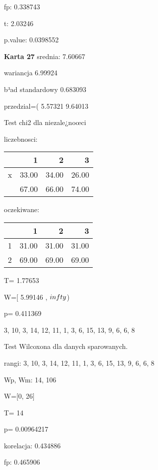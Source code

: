 \documentclass[a4paper,12pt]{article}
\begin{document}
\begin{multicols}{3}
     fp: 0.338743
     
     t: 2.03246
     
     p.value: 0.0398552 \vspace{1cm} 

  \textbf{Karta  27 } 
 srednia: 7.60667 
     
     wariancja 6.99924  
     
     b³ad standardowy 0.683093 
     
     przedzial=( 5.57321 9.64013 \vspace{1cm} 

  Test chi2 dla niezale¿noœci 
   
   liczebnosci: %
\begin{tabular}{rrrr}
  \hline
 & 1 & 2 & 3 \\
  \hline
x & 33.00 & 34.00 & 26.00 \\
   & 67.00 & 66.00 & 74.00 \\
   \hline
\end{tabular}
 
   
   oczekiwane: %
\begin{tabular}{rrrr}
  \hline
 & 1 & 2 & 3 \\
  \hline
1 & 31.00 & 31.00 & 31.00 \\
  2 & 69.00 & 69.00 & 69.00 \\
   \hline
\end{tabular}
 
   
   T= 1.77653 
   
   W=[ 5.99146 , $\\infty$) 
   
   p= 0.411369 \vspace{1cm} 

  3, 10, 3, 14, 12, 11, 1, 3, 6, 15, 13, 9, 6, 6, 8 

  Test Wilcoxona dla danych sparowanych. 
  
  rangi: 3, 10, 3, 14, 12, 11, 1, 3, 6, 15, 13, 9, 6, 6, 8 
  
  Wp, Wm:  14,  106 
  
  W=[0, 26]  
  
  T=  14 
  
  p= 0.00964217 \vspace{1cm} 

  korelacja: 0.434886
     
     fp: 0.465906
     

\end{multicols}
\end{document}
